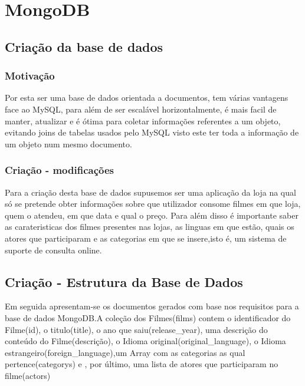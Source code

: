 \section{MongoDB}

\subsection{Criação da base de dados}

\subsubsection{Motivação}

Por esta ser uma base de dados orientada a documentos, tem várias vantagens face ao MySQL, para além de ser escalável horizontalmente, é mais facil de manter, atualizar e é ótima para coletar informações referentes a um objeto, evitando joins de tabelas usados pelo MySQL visto este ter toda a informação de um objeto num mesmo documento.

\subsubsection{Criação - modificações}

Para a criação desta base de dados supusemos ser uma aplicação da loja na qual só se pretende obter informações sobre que utilizador consome filmes em que loja, quem o atendeu, em que data e qual o preço. Para além disso é importante saber as carateristicas dos filmes presentes nas lojas, as linguas em que estão, quais os atores que participaram e as categorias em que se insere,isto é, um sistema de suporte de consulta online.

\subsection{Criação - Estrutura da Base de Dados}

\par Em seguida apresentam-se os documentos gerados com base nos requisitos para a base de dados MongoDB.A coleção dos Filmes(films) contem o identificador do Filme(id), o titulo(title), o ano que saiu(release\_year), uma descrição do conteúdo do Filme(descrição), o Idioma original(original\_language), o Idioma estrangeiro(foreign\_language),um Array com as categorias as qual pertence(categorys) e , por último, uma lista de atores que participaram no filme(actors)\newline

